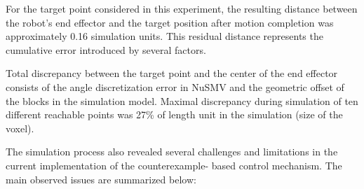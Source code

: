 For the target point considered in this experiment, the resulting distance 
between the robot's end effector and the target position after motion completion 
was approximately 0.16 simulation units. This residual distance represents 
the cumulative error introduced by several factors. 
%

Total discrepancy between the target point and the center of the 
end effector consists of the angle discretization error in NuSMV and 
the geometric offset of the blocks in the simulation model. 
Maximal discrepancy during simulation of ten different reachable points 
was 27\% of length unit in the simulation (size of the voxel).

The simulation process also revealed several challenges and 
limitations in the current implementation of the counterexample-
based control mechanism. 
The main observed issues are summarized below:

